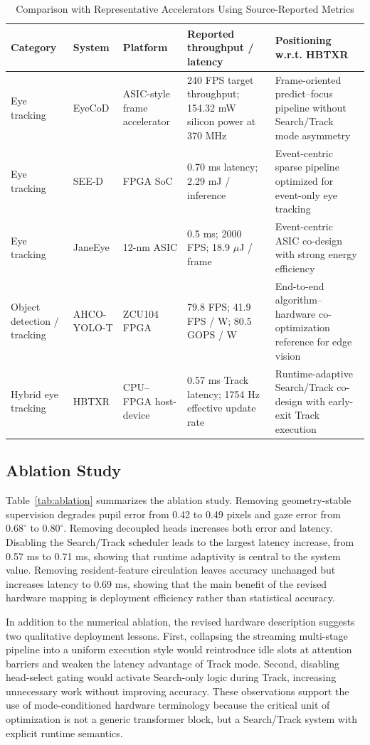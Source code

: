 \documentclass[journal]{IEEEtran}
\begin{document}
\begin{table}[t]
\caption{Comparison with Representative Accelerators Using Source-Reported Metrics}
\label{tab:accel}
\centering
\scriptsize
\begin{tabularx}{\textwidth}{@{}L{0.12\textwidth}L{0.12\textwidth}L{0.14\textwidth}Y Y@{}}
\toprule
Category & System & Platform & Reported throughput / latency & Positioning w.r.t. HBTXR \\
\midrule
Eye tracking & EyeCoD & ASIC-style frame accelerator & 240 FPS target throughput; 154.32 mW silicon power at 370 MHz & Frame-oriented predict--focus pipeline without Search/Track mode asymmetry \\
Eye tracking & SEE-D & FPGA SoC & 0.70 ms latency; 2.29 mJ / inference & Event-centric sparse pipeline optimized for event-only eye tracking \\
Eye tracking & JaneEye & 12-nm ASIC & 0.5 ms; 2000 FPS; 18.9 $\mu$J / frame & Event-centric ASIC co-design with strong energy efficiency \\
Object detection / tracking & AHCO-YOLO-T & ZCU104 FPGA & 79.8 FPS; 41.9 FPS / W; 80.5 GOPS / W & End-to-end algorithm--hardware co-optimization reference for edge vision \\
Hybrid eye tracking & HBTXR & CPU--FPGA host-device & 0.57 ms Track latency; 1754 Hz effective update rate & Runtime-adaptive Search/Track co-design with early-exit Track execution \\
\bottomrule
\end{tabularx}
\end{table}

\subsection{Ablation Study}
Table~\ref{tab:ablation} summarizes the ablation study. Removing geometry-stable supervision degrades pupil error from 0.42 to 0.49 pixels and gaze error from $0.68^{\circ}$ to $0.80^{\circ}$. Removing decoupled heads increases both error and latency. Disabling the Search/Track scheduler leads to the largest latency increase, from 0.57 ms to 0.71 ms, showing that runtime adaptivity is central to the system value. Removing resident-feature circulation leaves accuracy unchanged but increases latency to 0.69 ms, showing that the main benefit of the revised hardware mapping is deployment efficiency rather than statistical accuracy.

In addition to the numerical ablation, the revised hardware description suggests two qualitative deployment lessons. First, collapsing the streaming multi-stage pipeline into a uniform execution style would reintroduce idle slots at attention barriers and weaken the latency advantage of Track mode. Second, disabling head-select gating would activate Search-only logic during Track, increasing unnecessary work without improving accuracy. These observations support the use of mode-conditioned hardware terminology because the critical unit of optimization is not a generic transformer block, but a Search/Track system with explicit runtime semantics.
\end{document}
